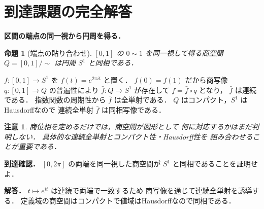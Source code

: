 \documentclass[a5paper,10pt,onecolumn]{jsarticle}
\makeatletter
\theoremstyle{mathnotetheorem}
\newtheorem{proposition}[theorem]{命題}
\newtheorem{remark}[theorem]{注意}
\renewcommand{\proofname}{証明}
\renewenvironment{proof}[1][\proofname]{%
  \par\pushQED{\qed}\normalfont\topsep4\p@\@plus2\p@\relax
  \trivlist\item[\hskip\labelsep\bfseries #1]\ignorespaces
}{\popQED\endtrivlist\@endpefalse}
\makeatother
\begin{document}
\section{到達課題の完全解答}
\noindent\textbf{区間の端点の同一視から円周を得る．}
\begin{proposition}[端点の貼り合わせ]
$[0,1]$ の $0\sim1$ を同一視して得る商空間
$Q=[0,1]/\sim$ は円周 $S^1$ と同相である．
\end{proposition}
\begin{proof}
$f:[0,1]\to S^1$ を $f(t)=e^{2\pi it}$ と置く．
$f(0)=f(1)$ だから商写像
$q:[0,1]\to Q$ の普遍性により
$\bar f:Q\to S^1$ が存在して $f=\bar f\circ q$ となり，
$\bar f$ は連続である．
指数関数の周期性から $\bar f$ は全単射である．
$Q$ はコンパクト，$S^1$ はHausdorffなので
連続全単射 $\bar f$ は同相写像である．
\end{proof}
\begin{remark}
商位相を定めるだけでは，商空間が図形として
何に対応するかはまだ判明しない．
具体的な連続全単射とコンパクト性・Hausdorff性を
組み合わせることが重要である．
\end{remark}
\noindent\textbf{到達確認．}
$[0,2\pi]$ の両端を同一視した商空間が
$S^1$ と同相であることを証明せよ．
\par\noindent\textbf{解答．}
$t\mapsto e^{it}$ は連続で両端で一致するため
商写像を通じて連続全単射を誘導する．
定義域の商空間はコンパクトで値域はHausdorffなので同相である．
\end{document}
